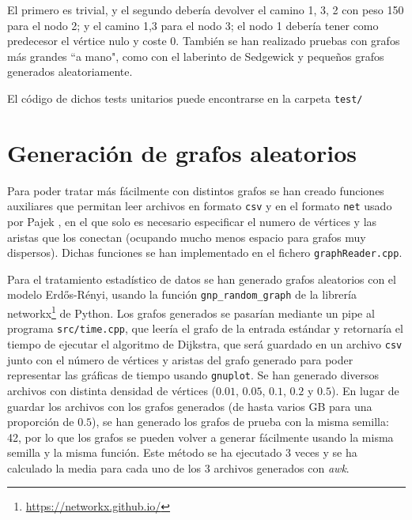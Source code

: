 \documentclass{article}
\begin{document}
El primero es trivial, y el segundo debería devolver el camino 1, 3, 2 con peso 150 para el nodo 2; y el camino 1,3 para el nodo 3; el nodo 1 debería tener como predecesor el vértice nulo y coste 0. También se han realizado pruebas con grafos más grandes ``a mano", como con el laberinto de Sedgewick \cite{SedgewickLabyrinth} y pequeños grafos generados aleatoriamente.

El código de dichos tests unitarios puede encontrarse en la carpeta \texttt{test/}

\section{Generación de grafos aleatorios}
Para poder tratar más fácilmente con distintos grafos se han creado funciones auxiliares que permitan leer archivos en formato \texttt{csv} y en el formato
\texttt{net}  usado por Pajek \cite{Pajek}, en el que solo es necesario especificar el numero de vértices y las aristas que los conectan (ocupando mucho menos espacio para grafos muy dispersos). Dichas funciones se han implementado en el fichero \texttt{graphReader.cpp}.

Para el tratamiento estadístico de datos se han generado grafos aleatorios con el modelo Erdős-Rényi, usando la función \texttt{gnp\_random\_graph} de la librería networkx\footnote{\url{https://networkx.github.io/}} de Python. Los grafos generados se pasarían mediante un pipe al programa \texttt{src/time.cpp}, que leería el grafo de la entrada estándar y retornaría el tiempo de ejecutar el algoritmo de Dijkstra, que será guardado en un archivo \texttt{csv} junto con el número de vértices y aristas del grafo generado para poder representar las gráficas de tiempo usando \texttt{gnuplot}. Se han generado diversos archivos con distinta densidad de vértices ($0.01$, $0.05$, $0.1$, $0.2$ y $0.5$). En lugar de guardar los archivos con los grafos generados (de hasta varios GB para una proporción de $0.5$), se han generado los grafos de prueba con la misma semilla: 42, por lo que los grafos se pueden volver a generar fácilmente usando la misma semilla y la misma función. Este método se ha ejecutado 3 veces y se ha calculado la media para cada uno de los 3 archivos generados con \textit{awk}.

\newpage
\end{document}
